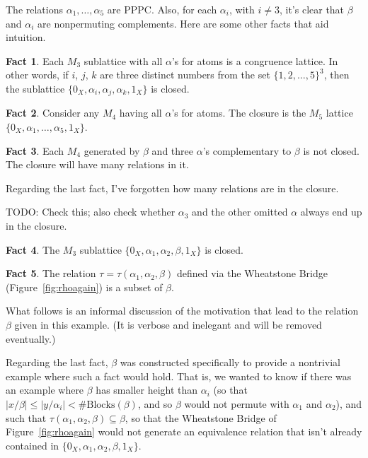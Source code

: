 \documentclass{amsart}
\theoremstyle{plain}
\theoremstyle{definition}
\newtheorem{fact}{Fact}[section]
\theoremstyle{definition}
\numberwithin{equation}{section}
\newcommand{\<}{\ensuremath{\langle}}
\renewcommand{\>}{\ensuremath{\rangle}}
\renewcommand{\leq}{\ensuremath{\leqslant}}
\newcommand{\nb}[1]{\ensuremath{\#\mathrm{Blocks}(#1)}}
\begin{document}
The relations $\alpha_1, \dots, \alpha_5$ are \acf{PPPC}.  Also, for 
each $\alpha_i$, with $i\neq 3$, it's clear that $\beta$ and $\alpha_i$ are
nonpermuting complements.
Here are some other facts that aid intuition.
\begin{fact}
  Each $M_3$ sublattice with all $\alpha$'s for atoms is a congruence lattice.  In
  other words, if $i$, $j$, $k$ are three distinct numbers from  the set 
  $\{1,2,\dots, 5\}^3$, then the sublattice $\{0_X, \alpha_i, \alpha_j,
  \alpha_k, 1_X\}$ is closed. 
\end{fact}
\begin{fact}
Consider any $M_4$ having all $\alpha$'s for atoms.  The closure is the $M_5$
lattice $\{0_X, \alpha_1, \dots, \alpha_5, 1_X\}$.
\end{fact}
\begin{fact}
  Each $M_4$ generated by $\beta$ and three $\alpha$'s complementary to
  $\beta$ is not closed.  The closure will have many relations in it.
\end{fact}
Regarding the last fact, I've forgotten how many relations are in the closure.

TODO: Check this; also check whether $\alpha_3$ and the other omitted $\alpha$
  always end up in the closure.
\begin{fact}
  The $M_3$ sublattice $\{0_X, \alpha_1, \alpha_2, \beta, 1_X\}$ is closed.
\end{fact}
  \begin{fact}
\label{fact:tau}
  The relation $\tau = \tau(\alpha_1, \alpha_2, \beta)$ defined via the
  Wheatstone Bridge (Figure~\ref{fig:rhoagain}) is a subset of $\beta$.
  \end{fact}

What follows is an informal discussion of the motivation that lead to the
relation $\beta$ given in this example.  (It is verbose and inelegant and
will be removed eventually.)

Regarding the last fact, $\beta$ was constructed specifically to provide a
nontrivial example where such a fact would hold.  That is, we wanted to know if
there was an example where $\beta$ has smaller height than $\alpha_i$ (so that 
$|x/\beta| \leq |y/\alpha_i| < \nb{\beta}$, and so $\beta$ would not permute
with $\alpha_1$ and $\alpha_2$), and such that 
$\tau(\alpha_1, \alpha_2, \beta)\subseteq \beta$, so that the Wheatstone
Bridge of Figure~\ref{fig:rhoagain} would not generate an equivalence
relation that isn't already contained in 
$\{0_X, \alpha_1, \alpha_2, \beta, 1_X\}$.
\end{document}
